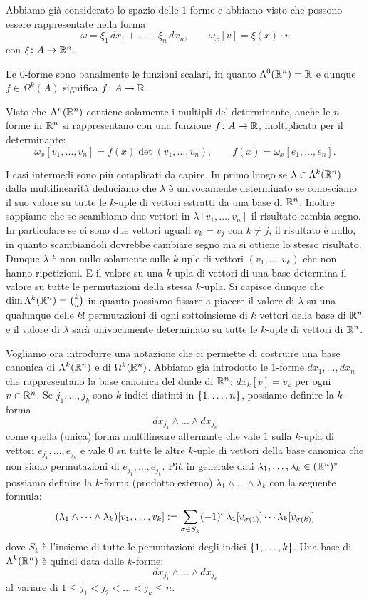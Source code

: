 Abbiamo già considerato lo spazio delle $1$-forme e abbiamo 
visto che possono essere rappresentate nella forma 
\[
  \omega = \xi_1\, dx_1 + \dots + \xi_n\, dx_n, 
  \qquad \omega_x[v] = \xi(x)\cdot v
\]
con $\xi\colon A \to {\mathbb R}^n$.

Le $0$-forme sono banalmente le funzioni scalari, in quanto $\Lambda^0({\mathbb R}^n)= {\mathbb R}$
e dunque $f \in \Omega^k(A)$ significa $f\colon A \to {\mathbb R}$.

Visto che $\Lambda^n({\mathbb R}^n)$ contiene solamente i multipli del determinante, 
anche le $n$-forme in ${\mathbb R}^n$ si rappresentano con una funzione $f\colon A\to{\mathbb R}$,
moltiplicata per il determinante: 
\[
 \omega_x[v_1,\dots,v_n] = f(x) \det(v_1, \dots, v_n),
 \qquad f(x) = \omega_x[e_1,\dots,e_n].
\]

I casi intermedi sono più complicati da capire.
In primo luogo se $\lambda\in \Lambda^k({\mathbb R}^n)$ 
dalla multilinearità deduciamo che $\lambda$ è univocamente determinato 
se conosciamo il suo valore su tutte le $k$-uple di vettori 
estratti da una base di ${\mathbb R}^n$.
Inoltre sappiamo che se scambiamo due vettori 
in $\lambda[v_1,\dots,v_n]$ il risultato cambia segno. 
In particolare se ci sono due vettori uguali $v_k=v_j$ con $k\neq j$, il risultato 
è nullo, in quanto scambiandoli dovrebbe cambiare segno ma si ottiene lo stesso risultato.
Dunque $\lambda$ è non nullo solamente sulle $k$-uple di vettori $(v_1,\dots,v_k)$ 
che non hanno ripetizioni. 
E il valore su una $k$-upla di vettori di una base 
determina il valore su tutte le permutazioni della stessa $k$-upla.
Si capisce dunque che $\dim \Lambda^k({\mathbb R}^n) = {k \choose n}$ in quanto 
possiamo fissare a piacere il valore di $\lambda$ su una 
qualunque delle $k!$ permutazioni di ogni sottoinsieme di $k$ vettori 
della base di ${\mathbb R}^n$ e il valore di $\lambda$ sarà univocamente determinato 
su tutte le $k$-uple di vettori di ${\mathbb R}^n$.

Vogliamo ora introdurre una notazione che ci permette di costruire una base 
canonica di $\Lambda^k({\mathbb R}^n)$ e di $\Omega^k({\mathbb R}^n)$.
Abbiamo già introdotto le $1$-forme $dx_1,\dots,dx_n$ che rappresentano 
la base canonica del duale di ${\mathbb R}^n$: $dx_k[v] = v_k$ per ogni $v\in {\mathbb R}^n$. 
Se $j_1, \dots, j_k$ sono $k$ indici distinti in ${\left\{ 1,\dots, n \right\}}$,
possiamo definire la $k$-forma 
\[
   dx_{j_1} \wedge \dots \wedge dx_{j_k}
\]
come quella (unica) forma multilineare alternante che vale $1$ 
sulla $k$-upla di vettori $e_{j_1}, \dots, e_{j_k}$ 
e vale $0$ su tutte le altre $k$-uple di vettori della base canonica
che non siano permutazioni di $e_{j_1}, \dots, e_{j_k}$.
Più in generale dati $\lambda_1,\dots, \lambda_k\in ({\mathbb R}^n)^*$ 
possiamo definire la $k$-forma (prodotto esterno) $\lambda_1 \wedge \dots \wedge \lambda_k$
con la seguente formula:
\[
  (\lambda_1 \wedge \dots \wedge \lambda_k)[v_1,\dots, v_k]
  := \sum_{\sigma\in S_k} (-1)^\sigma \lambda_1[v_{\sigma(1)}]\cdots \lambda_k[v_{\sigma(k)}]
\]
dove $S_k$ è l'insieme di tutte le permutazioni degli indici ${\left\{ 1,\dots, k \right\}}$.
Una base di $\Lambda^k({\mathbb R}^n)$ è quindi data dalle $k$-forme:
\[
   dx_{j_1} \wedge \dots \wedge dx_{j_k}
\]
al variare di $1\le j_1 < j_2 < \dots < j_k \le n$.

